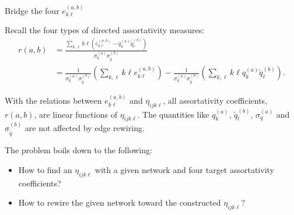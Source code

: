 \documentclass[xcolor=dvipsnames, compress, 10pt]{beamer}
\theoremstyle{remark}
\newcommand{\qout}{q^{(out)}}
\newcommand{\qind}{q^{(in)}}
\newcommand{\tq}{\tilde{q}}
\begin{document}
\begin{frame}{Bridge the four $e_{k\ell}^{(a, b)}$}

Recall the four types of directed assortativity measures:
\begin{align*}
	r(a, b) &= 
	\frac{\sum_{k,\ell} k\ell (e^{(a,b)}_{k\ell} - q_k^{(a)} \tq_\ell^{(b)})}{\sigma_q^{(a)} \sigma_{\tq}^{(b)}} \\
	&= \frac{1}{\sigma_q^{(a)} \sigma_{\tq}^{(b)}} 
		\left(\sum_{k,\ell} k\ell e^{(a,b)}_{k\ell}\right) - 
	\frac{1}{\sigma_q^{(a)} \sigma_{\tq}^{(b)}} 
		\left(\sum_{k,\ell} k\ell q_k^{(a)} \tq_\ell^{(b)}\right).
\end{align*}


\vspace{0.1cm}

With the relations between $e_{k\ell}^{(a, b)}$ and $\eta_{ijk\ell}$, all
assortativity coefficients, $r(a,b)$, are linear functions of $\eta_{ijk\ell}$.
The quantities like $q_k^{(a)}$, $\tq_l^{(b)}$, $\sigma_q^{(a)}$ and
$\sigma_{\tq}^{(b)}$ are not affected by edge rewiring.

\vspace{0.1cm}

The problem boils down to the following:
\begin{itemize}
	\item How to find an $\eta_{ijk\ell}$ with a given 
	network and four target assortativity coefficients?
	\item How to rewire the given network toward the constructed 
	$\eta_{ijk\ell}$?
\end{itemize}


\end{frame}


\end{document}
